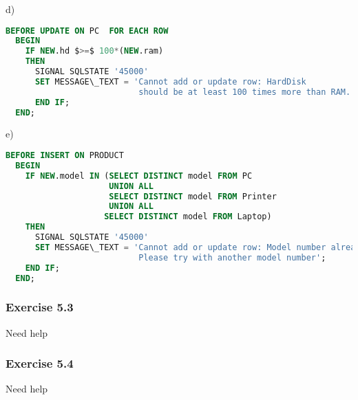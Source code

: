 \documentclass[../../main.tex]{subfiles}
\begin{document}
d)

\begin{lstlisting}[language=sql]
  BEFORE UPDATE ON PC  FOR EACH ROW
  BEGIN
    IF NEW.hd $>=$ 100*(NEW.ram)
    THEN
      SIGNAL SQLSTATE '45000'
      SET MESSAGE\_TEXT = 'Cannot add or update row: HardDisk
                           should be at least 100 times more than RAM.';
      END IF;
  END;
\end{lstlisting}

e)

\begin{lstlisting}[language=sql]
  BEFORE INSERT ON PRODUCT
  BEGIN
    IF NEW.model IN (SELECT DISTINCT model FROM PC
                     UNION ALL
                     SELECT DISTINCT model FROM Printer
                     UNION ALL
                    SELECT DISTINCT model FROM Laptop)
    THEN
      SIGNAL SQLSTATE '45000'
      SET MESSAGE\_TEXT = 'Cannot add or update row: Model number already assigned.
                           Please try with another model number';
    END IF;
  END;
\end{lstlisting}

\subsubsection*{Exercise 5.3}


Need help

\subsubsection*{Exercise 5.4}


Need help
\end{document}
